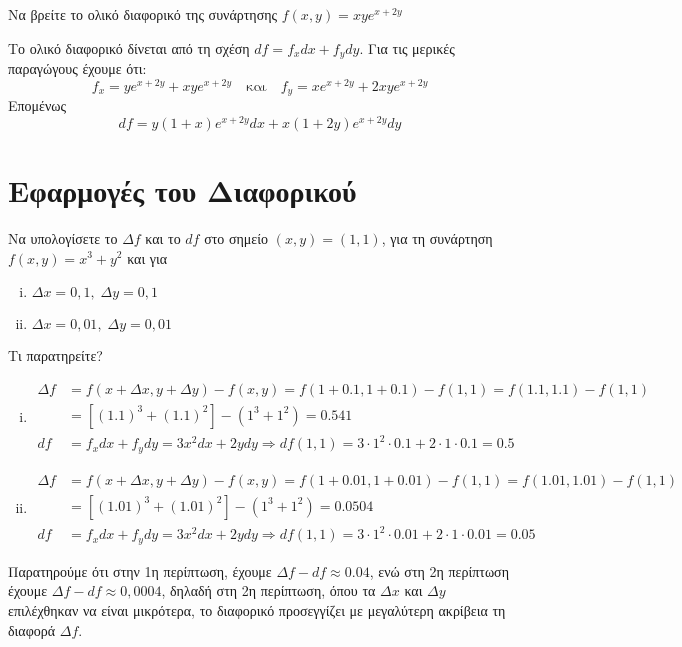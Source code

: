\begin{example}
  Να βρείτε το ολικό διαφορικό της συνάρτησης $ f(x,y) = xye^{x+2y} $ 
  \begin{solution}
  \item {}
    Το ολικό διαφορικό δίνεται από τη σχέση $ df = f_{x} dx + f_{y} dy $.  
    Για τις μερικές παραγώγους έχουμε ότι: 
    \[
      f_{x} = ye^{x+2y}+xye^{x+2y} \quad \text{και} \quad f_{y} = xe^{x+2y} +
      2xye^{x+2y}
    \] 
    Επομένως
    \[
      df = y(1+x)e^{x+2y} dx + x(1+2y)e^{x+2y}dy
    \]
  \end{solution}
\end{example}

\section{Εφαρμογές του Διαφορικού}

\begin{example}
  Να υπολογίσετε το $ \Delta f $ και το $ df $ στο σημείο $ (x,y) = (1,1) $, 
  για τη συνάρτηση $ f(x,y) = x^{3}+y^{2} $ και για 
  \begin{enumerate}[i)]
    \item $ \Delta x = 0,1, \; \Delta y = 0,1 $
    \item $ \Delta x = 0,01, \; \Delta y = 0,01 $
  \end{enumerate}
  Τι παρατηρείτε?
\end{example}
\begin{solution}
\item {}
  \begin{enumerate}[i)]
    \item 
      \begin{align*} 
        \Delta f &= f(x+ \Delta x, y + \Delta y) - f(x,y) = f(1+0.1,1+0.1) - 
        f(1,1) = f(1.1,1.1) - f(1,1) \\ 
                 &= [(1.1)^{3}+(1.1)^{2}] - (1^{3}+1^{2}) = 0.541 \\
        df &= f_{x}dx + f_{y}dy  = 3x^{2} dx + 2y dy \Rightarrow df (1,1) = 
        3\cdot 1^{2} \cdot 0.1 + 2 \cdot 1 \cdot 0.1 = 0.5 
      \end{align*}
    \item 
      \begin{align*} 
        \Delta f &= f(x+ \Delta x, y + \Delta y) - f(x,y) = f(1+0.01,1+0.01) - 
        f(1,1) = f(1.01,1.01) - f(1,1) \\ 
                 &= [(1.01)^{3}+(1.01)^{2}] - (1^{3}+1^{2}) = 0.0504 \\
        df &= f_{x}dx + f_{y}dy  = 3x^{2} dx + 2y dy \Rightarrow df (1,1) = 
        3\cdot 1^{2} \cdot 0.01 + 2 \cdot 1 \cdot 0.01 = 0.05 
      \end{align*}
  \end{enumerate}
  Παρατηρούμε ότι στην 1η περίπτωση, έχουμε
  $ \Delta f - df \approx 0.04 $, ενώ στη 2η περίπτωση έχουμε $ \Delta f - df \approx 
  0,0004 $, δηλαδή στη 2η περίπτωση, όπου τα $ \Delta x $ και $ \Delta y $ επιλέχθηκαν 
  να είναι μικρότερα, το διαφορικό προσεγγίζει με μεγαλύτερη ακρίβεια τη διαφορά 
  $ \Delta f $.
\end{solution}



